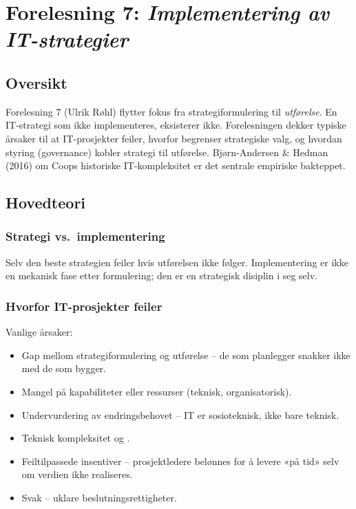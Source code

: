 \section{Forelesning 7: \emph{Implementering av IT-strategier}}
\label{sec:lec07}

\subsection*{Oversikt}
Forelesning 7 (Ulrik Røhl) flytter fokus fra strategiformulering til
\emph{utførelse}. En IT-strategi som ikke implementeres, eksisterer ikke.
Forelesningen dekker typiske årsaker til at IT-prosjekter feiler, hvorfor
 begrenser strategiske valg, og hvordan styring (governance)
kobler strategi til utførelse. Bjørn-Andersen \& Hedman (2016) om Coops
historiske IT-kompleksitet er det sentrale empiriske bakteppet.

\subsection{Hovedteori}

\subsubsection*{Strategi vs.\ implementering}
 Selv den beste
strategien feiler hvis utførelsen ikke følger. Implementering er ikke en
mekanisk fase etter formulering; den er en strategisk disiplin i seg selv.

\subsubsection*{Hvorfor IT-prosjekter feiler}
Vanlige årsaker:
\begin{itemize}
  \item Gap mellom strategiformulering og utførelse -- de som planlegger
    snakker ikke med de som bygger.
  \item Mangel på kapabiliteter eller ressurser (teknisk, organisatorisk).
  \item Undervurdering av endringsbehovet -- IT er sosioteknisk, ikke bare
    teknisk.
  \item Teknisk kompleksitet og .
  \item Feiltilpassede insentiver -- prosjektledere belønnes for å levere
    «på tid» selv om verdien ikke realiseres.
  \item Svak  -- uklare beslutningsrettigheter.
\end{itemize}

